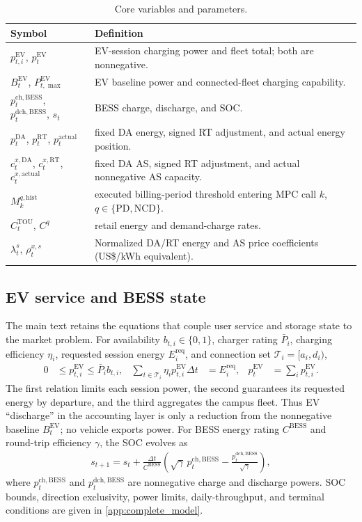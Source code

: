 \documentclass[final,5p,times]{elsarticle}
\newcommand{\dt}{\Delta t}
\newcommand{\EV}{\mathrm{EV}}
\newcommand{\BESS}{\mathrm{BESS}}
\newcommand{\DA}{\mathrm{DA}}
\newcommand{\RT}{\mathrm{RT}}
\newcommand{\TOU}{\mathrm{TOU}}
\newcommand{\PD}{\mathrm{PD}}
\newcommand{\NCD}{\mathrm{NCD}}
\newcommand{\ch}{\mathrm{ch}}
\newcommand{\dch}{\mathrm{dch}}
\newcommand{\actual}{\mathrm{actual}}
\newcommand{\hist}{\mathrm{hist}}
\newcommand{\req}{\mathrm{req}}
\newcommand{\calT}{\mathcal{T}}
\begin{document}
\begin{table}[!t]
\centering
\caption{Core variables and parameters.}
\label{tab:notation}
\scriptsize
\begin{tabularx}{\textwidth}{@{}p{}X@{}}
\toprule
Symbol & Definition \\
\midrule
$p_{t,i}^{\EV}$, $p_t^{\EV}$ & EV-session charging power and fleet total; both are nonnegative.\\
$B_t^{\EV}$, $P_{t,\max}^{\EV}$ & EV baseline power and connected-fleet charging capability.\\
$p_t^{\ch,\BESS}$, $p_t^{\dch,\BESS}$, $s_t$ & BESS charge, discharge, and SOC.\\
$p_t^{\DA}$, $p_t^{\RT}$, $p_t^{\actual}$ & fixed DA energy, signed RT adjustment, and actual energy position.\\
$c_t^{x,\DA}$, $c_t^{x,\RT}$, $c_t^{x,\actual}$ & fixed DA AS, signed RT adjustment, and actual nonnegative AS capacity.\\
$M_k^{q,\hist}$ & executed billing-period threshold entering MPC call $k$, $q\in\{\PD,\NCD\}$.\\
$C_t^{\TOU}$, $C^q$ & retail energy and demand-charge rates.\\
$\lambda_t^s$, $\rho_t^{x,s}$ & Normalized DA/RT energy and AS price coefficients (US\$/kWh equivalent).\\
\bottomrule
\end{tabularx}
\end{table}

\subsection{EV service and BESS state}
The main text retains the equations that couple user service and storage state
to the market problem. For availability $b_{t,i}\in\{0,1\}$, charger rating
$\bar P_i$, charging efficiency $\eta_i$, requested session energy
$E_i^{\req}$, and connection set $\calT_i=[a_i,d_i)$,
\begin{align}
0&\le p_{t,i}^{\EV}\le \bar P_i b_{t,i},
&\sum_{t\in\calT_i}\eta_i p_{t,i}^{\EV}\dt&=E_i^{\req},
&p_t^{\EV}&=\sum_i p_{t,i}^{\EV}. \label{eq:ev_core}
\end{align}
The first relation limits each session power, the second guarantees its
requested energy by departure, and the third aggregates the campus fleet. Thus
EV ``discharge'' in the accounting layer is only a reduction from the
nonnegative baseline $B_t^{\EV}$; no vehicle exports power. For BESS energy
rating $C^{\BESS}$ and round-trip efficiency $\gamma$, the SOC evolves as
\begin{align}
s_{t+1}=s_t+\frac{\dt}{C^{\BESS}}
\left(\sqrt{\gamma}\,p_t^{\ch,\BESS}
-\frac{p_t^{\dch,\BESS}}{\sqrt{\gamma}}\right), \label{eq:soc}
\end{align}
where $p_t^{\ch,\BESS}$ and $p_t^{\dch,\BESS}$ are nonnegative charge and
discharge powers. SOC bounds, direction exclusivity, power limits,
daily-throughput, and terminal conditions are given in \ref{app:complete_model}.
\end{document}
